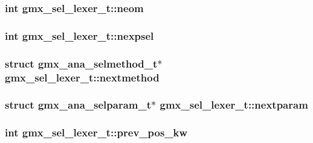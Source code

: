 \hypertarget{structgmx__sel__lexer__t_a5c19cf6e921545d45e0843fc5e29458a}{
\subsubsection[{neom}]{\setlength{\rightskip}{0pt plus 5cm}int {\bf gmx\-\_\-sel\-\_\-lexer\-\_\-t\-::neom}}}\label{structgmx__sel__lexer__t_a5c19cf6e921545d45e0843fc5e29458a}
\hypertarget{structgmx__sel__lexer__t_a5695b1b723a0613de0aed182033788bf}{
\subsubsection[{nexpsel}]{\setlength{\rightskip}{0pt plus 5cm}int {\bf gmx\-\_\-sel\-\_\-lexer\-\_\-t\-::nexpsel}}}\label{structgmx__sel__lexer__t_a5695b1b723a0613de0aed182033788bf}
\hypertarget{structgmx__sel__lexer__t_ae2cf4bd2491f89b3f4b2c3da9c11e450}{
\subsubsection[{nextmethod}]{\setlength{\rightskip}{0pt plus 5cm}struct {\bf gmx\-\_\-ana\-\_\-selmethod\-\_\-t}$\ast$ {\bf gmx\-\_\-sel\-\_\-lexer\-\_\-t\-::nextmethod}}}\label{structgmx__sel__lexer__t_ae2cf4bd2491f89b3f4b2c3da9c11e450}
\hypertarget{structgmx__sel__lexer__t_aa5198ac84c3303505202a7b6b6cb17d1}{
\subsubsection[{nextparam}]{\setlength{\rightskip}{0pt plus 5cm}struct {\bf gmx\-\_\-ana\-\_\-selparam\-\_\-t}$\ast$ {\bf gmx\-\_\-sel\-\_\-lexer\-\_\-t\-::nextparam}}}\label{structgmx__sel__lexer__t_aa5198ac84c3303505202a7b6b6cb17d1}
\hypertarget{structgmx__sel__lexer__t_a2d1f374ebc06436e028d3e248c61de94}{
\subsubsection[{prev\-\_\-pos\-\_\-kw}]{\setlength{\rightskip}{0pt plus 5cm}int {\bf gmx\-\_\-sel\-\_\-lexer\-\_\-t\-::prev\-\_\-pos\-\_\-kw}}}\label{structgmx__sel__lexer__t_a2d1f374ebc06436e028d3e248c61de94}
